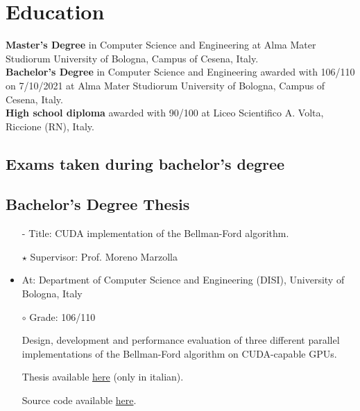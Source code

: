 \documentclass[curriculum-vitae-eng]{subfiles}
\begin{document}
	\section*{Education}
		 \textbf{Master's Degree} in Computer Science and Engineering at Alma Mater Studiorum University of Bologna, Campus of Cesena, Italy.\\
		
		 \textbf{Bachelor's Degree} in Computer Science and Engineering awarded with 106/110 on 7/10/2021 at Alma Mater Studiorum University of Bologna, Campus of Cesena, Italy.\\

		 \textbf{High school diploma} awarded with 90/100 at Liceo Scientifico A. Volta, Riccione (RN), Italy.
		
		\subsection*{Exams taken during bachelor's degree}
			\begin{minipage}[t]{.47\textwidth}
			\end{minipage}
			\hfill
			\begin{minipage}[t]{.47\textwidth}
			\end{minipage}

		\subsection*{Bachelor's Degree Thesis}
			\begin{itemize}
				\item[-] {\large Title:} CUDA implementation of the Bellman-Ford algorithm.
				\item[$\star$] {\large Supervisor:} Prof. Moreno Marzolla
				\item {\large At:} Department of Computer Science and Engineering (DISI), University of Bologna, Italy
				\item[$\circ$] {\large Grade:} 106/110
				\item[] Design, development and performance evaluation of three different parallel implementations of the Bellman-Ford algorithm on CUDA-capable GPUs.
				\item[] Thesis available \href{https://amslaurea.unibo.it/24313}{here} (only in italian).
				\item[] Source code available \href{https://github.com/Ledmington/bellman-ford-cuda}{here}.
			\end{itemize}
		
\end{document}
